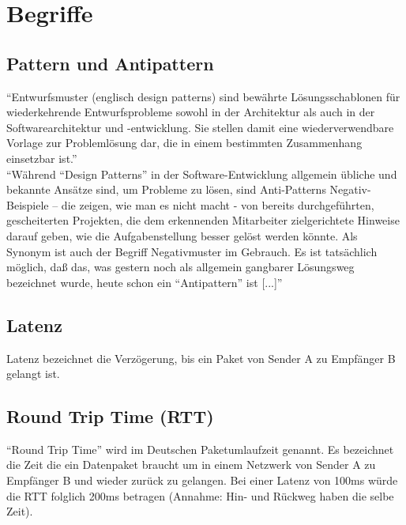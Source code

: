 
\section{Begriffe}
\label{sec:begriffe}
	\subsection{Pattern und Antipattern} %
	\label{sub:pattern_und_anti_pattern}
		"`Entwurfsmuster (englisch design patterns) sind bewährte Lösungsschablonen für wiederkehrende Entwurfsprobleme sowohl in der Architektur als auch in der Softwarearchitektur und -entwicklung. Sie stellen damit eine wiederverwendbare Vorlage zur Problemlösung dar, die in einem bestimmten Zusammenhang einsetzbar ist."'\autocite{pattern15}
		\\

		"`Während "`Design Patterns"' in der Software-Entwicklung allgemein übliche und bekannte Ansätze sind, um Probleme zu lösen, sind Anti-Patterns Negativ-Beispiele – die zeigen, wie man es nicht macht - von bereits durchgeführten, gescheiterten Projekten, die dem erkennenden Mitarbeiter zielgerichtete Hinweise darauf geben, wie die Aufgabenstellung besser gelöst werden könnte. Als Synonym ist auch der Begriff Negativmuster im Gebrauch. Es ist tatsächlich möglich, daß das, was gestern noch als allgemein gangbarer Lösungsweg bezeichnet wurde, heute schon ein "`Antipattern"' ist [...]"' \autocite{Stepken06}



	\subsection{Latenz} %
	\label{sub:latenz}
		Latenz bezeichnet die Verzögerung, bis ein Paket von Sender A zu Empfänger B gelangt ist.


	\subsection{Round Trip Time (RTT)} %
	\label{sub:round_trip_time_}
		"`Round Trip Time"' wird im Deutschen Paketumlaufzeit genannt. Es bezeichnet die Zeit die ein Datenpaket braucht um in einem Netzwerk von Sender A zu Empfänger B und wieder zurück zu gelangen. Bei einer Latenz von 100ms würde die RTT folglich 200ms betragen (Annahme: Hin- und Rückweg haben die selbe Zeit).
	



